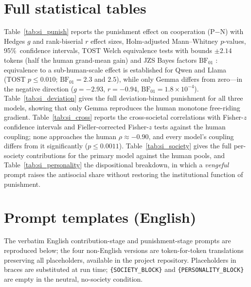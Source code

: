 \documentclass[11pt]{article}
\begin{document}
\section{Full statistical tables}

Table~\ref{tab:si_punish} reports the punishment effect on cooperation (P$-$N) with
Hedges $g$ and rank-biserial $r$ effect sizes, Holm-adjusted Mann--Whitney
$p$-values, 95\%\ confidence intervals, TOST Welch equivalence tests
\cite{lakens2018equivalence} with bounds $\pm2.14$ tokens (half the human
grand-mean gain) and JZS Bayes factors $\mathrm{BF}_{01}$ \cite{rouder2009bayesian}:
equivalence to a sub-human-scale effect is established for Qwen and Llama (TOST
$p\le0.010$; $\mathrm{BF}_{01}=2.3$ and $2.5$), while only Gemma differs from
zero---in the negative direction ($g=-2.93$, $r=-0.94$,
$\mathrm{BF}_{01}=1.8\times10^{-4}$). Table~\ref{tab:si_deviation} gives the
full deviation-binned punishment for all three models, showing that only Gemma
reproduces the human monotone free-riding gradient. Table~\ref{tab:si_cross}
reports the cross-societal correlations with Fisher-$z$ confidence intervals and
Fieller-corrected Fisher-$z$ tests against the human coupling; none approaches
the human $\rho\approx-0.90$, and every model's coupling differs from it
significantly ($p\le0.0011$). Table~\ref{tab:si_society} gives the full
per-society contributions for the primary model against the human pools, and
Table~\ref{tab:si_personality} the dispositional breakdown, in which a
\emph{vengeful} prompt raises the antisocial share without restoring the
institutional function of punishment.

\small

\normalsize

\section{Prompt templates (English)}

The verbatim English contribution-stage and punishment-stage prompts are
reproduced below; the four non-English versions are token-for-token translations
preserving all placeholders, available in the project repository. Placeholders in
braces are substituted at run time; \texttt{\{SOCIETY\_BLOCK\}} and
\texttt{\{PERSONALITY\_BLOCK\}} are empty in the neutral, no-society condition.
\end{document}
